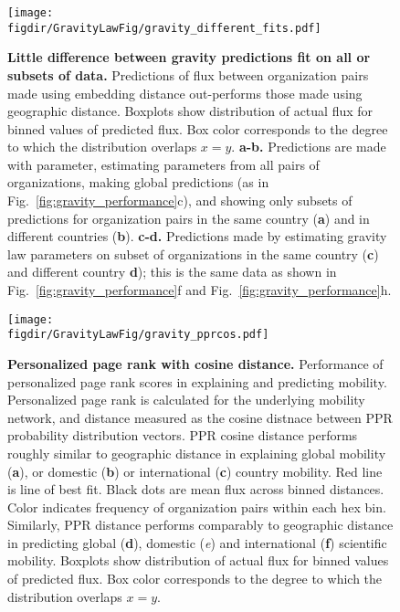 \documentclass[12pt]{article} %
\def\figdir{../Figs}
\begin{document}
%
%
\begin{figure}[p!]
	\centering
	\texttt{[image: \\figdir/GravityLawFig/gravity\_different\_fits.pdf]}
	\caption{
		\textbf{Little difference between gravity predictions fit on all or subsets of data.}
		Predictions of flux between organization pairs made using embedding distance out-performs those made using geographic distance. 
		Boxplots show distribution of actual flux for binned values of predicted flux.
		Box color corresponds to the degree to which the distribution overlaps $x = y$.
		\textbf{a-b.} Predictions are made with parameter, estimating parameters from all pairs of organizations, making global predictions (as in Fig.~\ref{fig:gravity_performance}c), and showing only subsets of predictions for organization pairs in the same country (\textbf{a}) and in different countries (\textbf{b}).
		\textbf{c-d.} Predictions made by estimating gravity law parameters on subset of organizations in the same country (\textbf{c}) and different country \textbf{d}); 
		this is the same data as shown in Fig.~\ref{fig:gravity_performance}f and Fig.~\ref{fig:gravity_performance}h. 
	}
	\label{fig:supp:gravity_prediction_subsets}
\end{figure}


%
%
\begin{figure}[p!]
	\centering
	\texttt{[image: \\figdir/GravityLawFig/gravity\_pprcos.pdf]}
	\caption{
		\textbf{Personalized page rank with cosine distance.}
		Performance of personalized page rank scores in explaining and predicting mobility.
		Personalized page rank is calculated for the underlying mobility network, and distance measured as the cosine distnace between PPR probability distribution vectors.
		PPR cosine distance performs roughly similar to geographic distance in explaining global mobility (\textbf{a}), or domestic (\textbf{b}) or international (\textbf{c}) country mobility.
		Red line is line of best fit. 
		Black dots are mean flux across binned distances.
		Color indicates frequency of organization pairs within each hex bin.
		Similarly, PPR distance performs comparably to geographic distance in predicting global (\textbf{d}), domestic (\textit{e}) and international (\textbf{f}) scientific mobility. 
		Boxplots show distribution of actual flux for binned values of predicted flux.
		Box color corresponds to the degree to which the distribution overlaps $x = y$.
	}
	\label{fig:supp:gravity_pprcos}
\end{figure}
\end{document}
